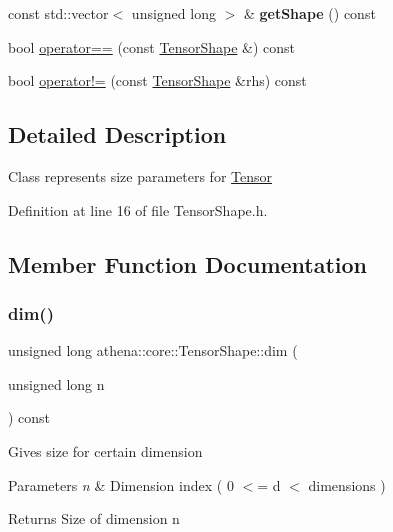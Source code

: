 \begin{DoxyCompactItemize}
\item 
\mbox{\label{classathena_1_1core_1_1_tensor_shape_ab76bd8f258b315eedcae3eae2d46a73d}} 
const std\+::vector$<$ unsigned long $>$ \& {\bfseries get\+Shape} () const
\item 
bool \mbox{\hyperlink{classathena_1_1core_1_1_tensor_shape_aa42737e3e51e76507bb60791889d4d9b}{operator==}} (const \mbox{\hyperlink{classathena_1_1core_1_1_tensor_shape}{Tensor\+Shape}} \&) const
\item 
bool \mbox{\hyperlink{classathena_1_1core_1_1_tensor_shape_acdb5b20f9922cb4d7ee29a868fd05b1b}{operator!=}} (const \mbox{\hyperlink{classathena_1_1core_1_1_tensor_shape}{Tensor\+Shape}} \&rhs) const
\end{DoxyCompactItemize}


\subsection{Detailed Description}
Class represents size parameters for \mbox{\hyperlink{classathena_1_1core_1_1_tensor}{Tensor}} 

Definition at line 16 of file Tensor\+Shape.\+h.



\subsection{Member Function Documentation}
\mbox{\label{classathena_1_1core_1_1_tensor_shape_ac0433f4e7a42e5307bb9fb976befdd47}} 
\subsubsection{\texorpdfstring{dim()}{dim()}}
{\footnotesize\ttfamily unsigned long athena\+::core\+::\+Tensor\+Shape\+::dim (\begin{DoxyParamCaption}\item[{unsigned long}]{n }\end{DoxyParamCaption}) const}

Gives size for certain dimension 
\begin{DoxyParams}{Parameters}
{\em n} & Dimension index ( 0 $<$= d $<$ dimensions ) \\
\hline
\end{DoxyParams}
\begin{DoxyReturn}{Returns}
Size of dimension n 
\end{DoxyReturn}


